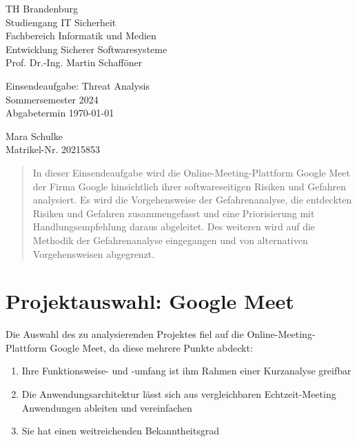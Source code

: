\documentclass{article}
\begin{document}
\begin{titlepage}
	\begin{flushleft}
		TH Brandenburg \\
		Studiengang IT Sicherheit \\
		Fachbereich Informatik und Medien \\
		Entwicklung Sicherer Softwaresysteme \\
		Prof. Dr.-Ing. Martin Schafföner
	\end{flushleft}

	\vfill

	\begin{center}
		\Large{Einsendeaufgabe: Threat Analysis}\\[0.5em]
		\large{Sommersemester 2024}\\[0.25em]
		\large{Abgabetermin \today}
	\end{center}

	\vfill

	\begin{flushright}
		Mara Schulke \\
		Matrikel-Nr. 20215853
	\end{flushright}
\end{titlepage}

\begin{abstract}
	In dieser Einsendeaufgabe wird die Online-Meeting-Plattform Google Meet der Firma 
	Google hinsichtlich ihrer softwareseitigen Risiken und Gefahren analysiert.
	Es wird die Vorgehensweise der Gefahrenanalyse, die entdeckten Risiken und Gefahren 
	zusammengefasst und eine Priorisierung mit Handlungsempfehlung daraus abgeleitet. Des 
	weiteren wird auf die Methodik der Gefahrenanalyse eingegangen und von alternativen 
	Vorgehensweisen abgegrenzt.
\end{abstract}

\tableofcontents

\listoffigures

\section{Projektauswahl: Google Meet}

Die Auswahl des zu analysierenden Projektes fiel auf die Online-Meeting-Plattform Google 
Meet, da diese mehrere Punkte abdeckt:

\begin{enumerate}
	\item Ihre Funktionsweise- und -umfang ist ihm Rahmen einer Kurzanalyse greifbar
	\item Die Anwendungsarchitektur lässt sich aus vergleichbaren Echtzeit-Meeting Anwendungen ableiten und vereinfachen
	\item Sie hat einen weitreichenden Bekanntheitsgrad
\end{enumerate}
\end{document}
